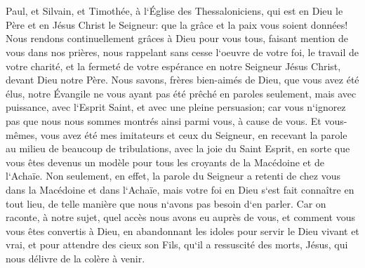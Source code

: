 

\chapter{}

\verse Paul, et Silvain, et Timothée, à l`Église des Thessaloniciens, qui est en Dieu le Père et en Jésus Christ le Seigneur: que la grâce et la paix vous soient données! 
\verse Nous rendons continuellement grâces à Dieu pour vous tous, faisant mention de vous dans nos prières, 
\verse nous rappelant sans cesse l`oeuvre de votre foi, le travail de votre charité, et la fermeté de votre espérance en notre Seigneur Jésus Christ, devant Dieu notre Père. 
\verse Nous savons, frères bien-aimés de Dieu, que vous avez été élus, 
\verse notre Évangile ne vous ayant pas été prêché en paroles seulement, mais avec puissance, avec l`Esprit Saint, et avec une pleine persuasion; car vous n`ignorez pas que nous nous sommes montrés ainsi parmi vous, à cause de vous. 
\verse Et vous-mêmes, vous avez été mes imitateurs et ceux du Seigneur, en recevant la parole au milieu de beaucoup de tribulations, avec la joie du Saint Esprit, 
\verse en sorte que vous êtes devenus un modèle pour tous les croyants de la Macédoine et de l`Achaïe. 
\verse Non seulement, en effet, la parole du Seigneur a retenti de chez vous dans la Macédoine et dans l`Achaïe, mais votre foi en Dieu s`est fait connaître en tout lieu, de telle manière que nous n`avons pas besoin d`en parler. 
\verse Car on raconte, à notre sujet, quel accès nous avons eu auprès de vous, et comment vous vous êtes convertis à Dieu, en abandonnant les idoles pour servir le Dieu vivant et vrai, 
\verse et pour attendre des cieux son Fils, qu`il a ressuscité des morts, Jésus, qui nous délivre de la colère à venir. 

\chapter{}

